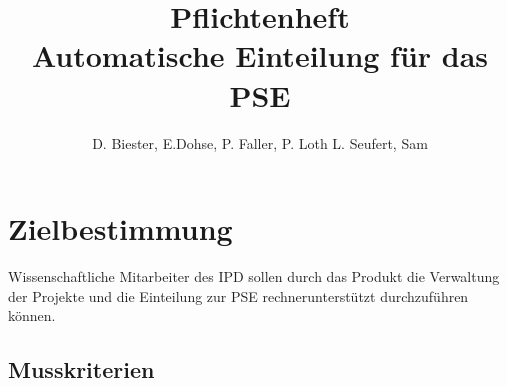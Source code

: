 \documentclass[parskip=full]{scrartcl}
\begin{document}
\title{Pflichtenheft \\
        \large Automatische Einteilung für das PSE}

\author{D. Biester, E.Dohse, P. Faller, P. Loth L. Seufert, Sam}
        
\maketitle
\pagebreak

\tableofcontents
\pagebreak

\section{Zielbestimmung}
Wissenschaftliche Mitarbeiter des IPD sollen durch das Produkt die Verwaltung
der Projekte und die Einteilung zur PSE rechnerunterstützt durchzuführen können.

 
\subsection{Musskriterien}
\end{document}
